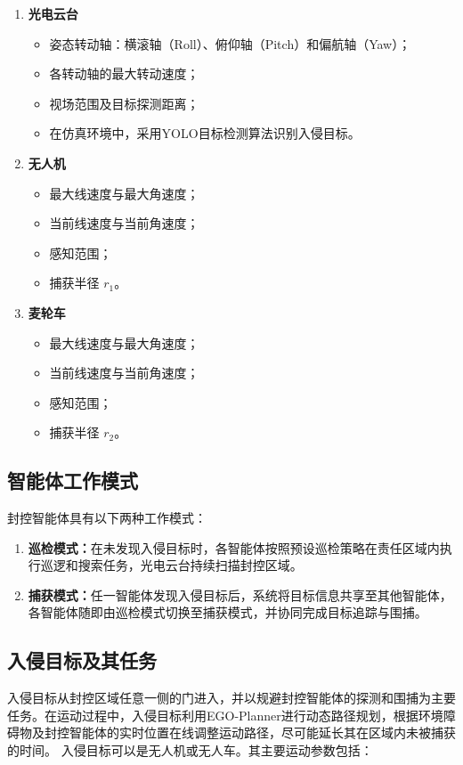 \begin{enumerate}
    \item \textbf{光电云台}
    \begin{itemize}
        \item 姿态转动轴：横滚轴（Roll）、俯仰轴（Pitch）和偏航轴（Yaw）；
        \item 各转动轴的最大转动速度；
        \item 视场范围及目标探测距离；
        \item 在仿真环境中，采用YOLO目标检测算法识别入侵目标。
    \end{itemize}

    \item \textbf{无人机}
    \begin{itemize}
        \item 最大线速度与最大角速度；
        \item 当前线速度与当前角速度；
        \item 感知范围；
        \item 捕获半径 $r_1$。
    \end{itemize}

    \item \textbf{麦轮车}
    \begin{itemize}
        \item 最大线速度与最大角速度；
        \item 当前线速度与当前角速度；
        \item 感知范围；
        \item 捕获半径 $r_2$。
    \end{itemize}
\end{enumerate}

\subsection{智能体工作模式}

封控智能体具有以下两种工作模式：

\begin{enumerate}
    \item \textbf{巡检模式：}在未发现入侵目标时，各智能体按照预设巡检策略在责任区域内执行巡逻和搜索任务，光电云台持续扫描封控区域。
    \item \textbf{捕获模式：}任一智能体发现入侵目标后，系统将目标信息共享至其他智能体，各智能体随即由巡检模式切换至捕获模式，并协同完成目标追踪与围捕。
\end{enumerate}

\subsection{入侵目标及其任务}
入侵目标从封控区域任意一侧的门进入，并以规避封控智能体的探测和围捕为主要任务。在运动过程中，入侵目标利用EGO-Planner进行动态路径规划，根据环境障碍物及封控智能体的实时位置在线调整运动路径，尽可能延长其在区域内未被捕获的时间。
入侵目标可以是无人机或无人车。其主要运动参数包括：

